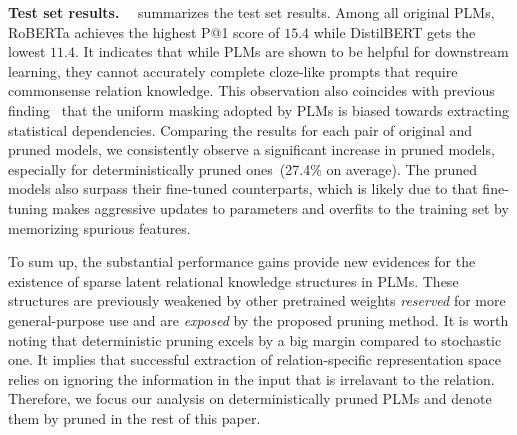 \noindent
\textbf{Test set results.}~~ summarizes the test set results. 
Among all original PLMs, RoBERTa achieves the highest P@1 score of $15.4$ while DistilBERT gets the lowest $11.4$. It indicates that while PLMs are shown to be helpful for downstream learning, they cannot accurately complete cloze-like prompts that require commonsense relation knowledge. This observation also coincides with 
previous finding~\citep{inductivemlm} that the uniform masking adopted by PLMs is biased towards 
extracting statistical dependencies. 
Comparing the results for each pair of original and pruned models, we consistently observe 
a significant increase in pruned models, especially for deterministically pruned ones~(27.4\% on average). 
The pruned models also surpass their fine-tuned counterparts, which is likely due to 
that fine-tuning makes aggressive updates to parameters and overfits to the training set 
by memorizing spurious features.

To sum up, the substantial performance gains provide new evidences for the existence of sparse 
latent relational knowledge structures in PLMs. These structures are previously weakened by 
other pretrained weights \textit{reserved} for more general-purpose use and are \textit{exposed} by 
the proposed pruning method. It is worth noting that deterministic pruning excels 
by a big margin compared to stochastic one. It implies that successful extraction of 
relation-specific representation space relies on ignoring the information in the input that 
is irrelavant to the relation.  Therefore, we focus our analysis on deterministically 
pruned PLMs and denote them by \textsf{pruned} in the rest of this paper. 


